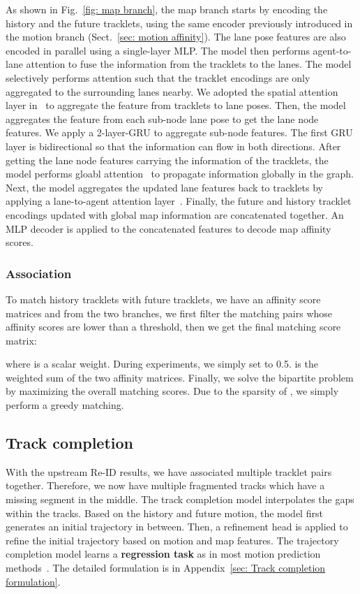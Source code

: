 \documentclass{article} \usepackage{iclr2023_conference,times}
\begin{document}
As shown in Fig.~\ref{fig: map branch}, the map branch starts by encoding the history and the future tracklets, using the same encoder previously introduced in the motion branch (Sect.~\ref{sec: motion affinity}). The lane pose features are also encoded in parallel using a single-layer MLP. The model then performs agent-to-lane attention to fuse the information from the tracklets to the lanes. The model selectively performs attention such that the tracklet encodings are only aggregated to the surrounding lanes nearby. We adopted the spatial attention layer in~\cite{laneGCN} to aggregate the feature from tracklets to lane poses.
Then, the model aggregates the feature from each sub-node lane pose to get the lane node features. We apply a 2-layer-GRU to aggregate sub-node features. The first GRU layer is bidirectional so that the information can flow in both directions. 
After getting the lane node features carrying the information of the tracklets, the model performs gloabl attention~\cite{Transformer_attention} to propagate information globally in the graph.
Next, the model aggregates the updated lane features back to tracklets by applying a lane-to-agent attention layer~\cite{laneGCN}. Finally, the future and history tracklet encodings updated with global map information are concatenated together. An MLP decoder is applied to the concatenated features to decode map affinity scores.

\vspace{-1mm}
\subsubsection{Association}
\vspace{-1mm}
To match  history tracklets with  future tracklets, we have an affinity score matrices  and  from the two branches, we first filter the matching pairs whose affinity scores are lower than a threshold, then we get the final matching score matrix:

where  is a scalar weight. During experiments, we simply set  to 0.5.
  is the weighted sum of the two affinity matrices. Finally, we solve the bipartite problem by maximizing the overall matching scores. Due to the sparsity of , we simply perform a greedy matching.
\vspace{-1mm}
\subsection{Track completion}
\vspace{-1mm}
\label{sec: track completion}
With the upstream Re-ID results, we have associated multiple tracklet pairs together. Therefore, we now have multiple fragmented tracks which have a missing segment in the middle. The track completion model interpolates the gaps within the tracks. Based on the history and future motion, the model first generates an initial trajectory in between. Then, a refinement head is applied to refine the initial trajectory based on motion and map features. The trajectory completion model learns a \textbf{regression task} as in most motion prediction methods~\cite{laneGCN,PGP}. The detailed formulation is in Appendix~\ref{sec: Track completion formulation}.
\end{document}
